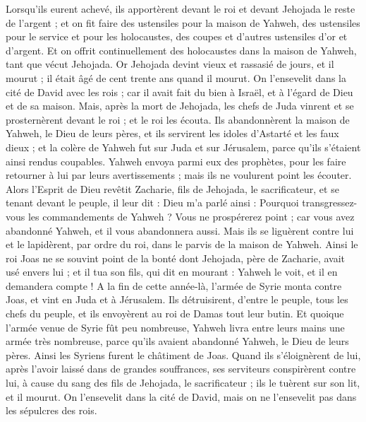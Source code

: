 \begin{multicols}{2}
Lorsqu'ils eurent achevé, ils apportèrent devant le roi et devant Jehojada le reste de l'argent ; et on fit faire des ustensiles pour la maison de Yahweh, des ustensiles pour le service et pour les holocaustes, des coupes et d'autres ustensiles d'or et d'argent. Et on offrit continuellement des holocaustes dans la maison de Yahweh, tant que vécut Jehojada.
Or Jehojada devint vieux et rassasié de jours, et il mourut ; il était âgé de cent trente ans quand il mourut.
On l'ensevelit dans la cité de David avec les rois ; car il avait fait du bien à Israël, et à l'égard de Dieu et de sa maison.
Mais, après la mort de Jehojada, les chefs de Juda vinrent et se prosternèrent devant le roi ; et le roi les écouta.
Ils abandonnèrent la maison de Yahweh, le Dieu de leurs pères, et ils servirent les idoles d'Astarté et les faux dieux ; et la colère de Yahweh fut sur Juda et sur Jérusalem, parce qu'ils s'étaient ainsi rendus coupables.
Yahweh envoya parmi eux des prophètes, pour les faire retourner à lui par leurs avertissements ; mais ils ne voulurent point les écouter.
Alors l'Esprit de Dieu revêtit Zacharie, fils de Jehojada, le sacrificateur, et se tenant devant le peuple, il leur dit : Dieu m'a parlé ainsi : Pourquoi transgressez-vous les commandements de Yahweh ? Vous ne prospérerez point ; car vous avez abandonné Yahweh, et il vous abandonnera aussi.
Mais ils se liguèrent contre lui et le lapidèrent, par ordre du roi, dans le parvis de la maison de Yahweh.
Ainsi le roi Joas ne se souvint point de la bonté dont Jehojada, père de Zacharie, avait usé envers lui ; et il tua son fils, qui dit en mourant : Yahweh le voit, et il en demandera compte !
A la fin de cette année-là, l'armée de Syrie monta contre Joas, et vint en Juda et à Jérusalem. Ils détruisirent, d'entre le peuple, tous les chefs du peuple, et ils envoyèrent au roi de Damas tout leur butin.
Et quoique l'armée venue de Syrie fût peu nombreuse, Yahweh livra entre leurs mains une armée très nombreuse, parce qu'ils avaient abandonné Yahweh, le Dieu de leurs pères. Ainsi les Syriens furent le châtiment de Joas.
Quand ils s'éloignèrent de lui, après l'avoir laissé dans de grandes souffrances, ses serviteurs conspirèrent contre lui, à cause du sang des fils de Jehojada, le sacrificateur ; ils le tuèrent sur son lit, et il mourut. On l'ensevelit dans la cité de David, mais on ne l'ensevelit pas dans les sépulcres des rois.

\end{multicols}
